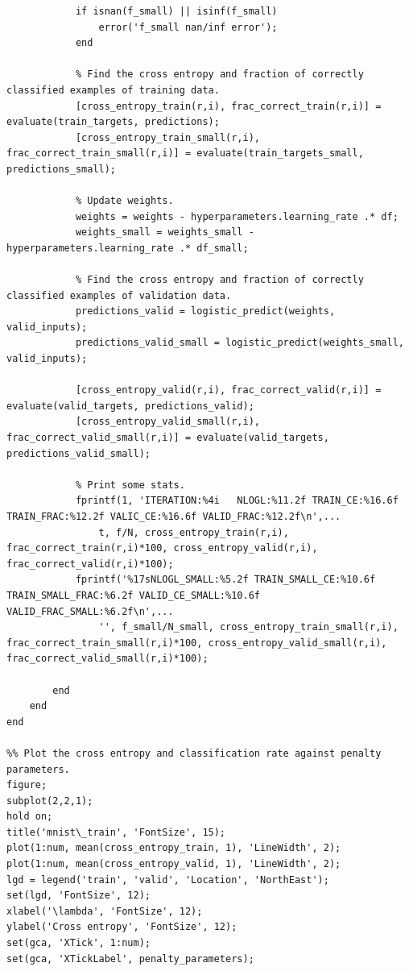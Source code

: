 \documentclass{article}
\begin{document}
\begin{lstlisting}
            if isnan(f_small) || isinf(f_small)
                error('f_small nan/inf error');
            end
            
            % Find the cross entropy and fraction of correctly classified examples of training data.
            [cross_entropy_train(r,i), frac_correct_train(r,i)] = evaluate(train_targets, predictions);
            [cross_entropy_train_small(r,i), frac_correct_train_small(r,i)] = evaluate(train_targets_small, predictions_small);
            
            % Update weights.
            weights = weights - hyperparameters.learning_rate .* df;
            weights_small = weights_small - hyperparameters.learning_rate .* df_small;
            
            % Find the cross entropy and fraction of correctly classified examples of validation data.
            predictions_valid = logistic_predict(weights, valid_inputs);
            predictions_valid_small = logistic_predict(weights_small, valid_inputs);
            
            [cross_entropy_valid(r,i), frac_correct_valid(r,i)] = evaluate(valid_targets, predictions_valid);
            [cross_entropy_valid_small(r,i), frac_correct_valid_small(r,i)] = evaluate(valid_targets, predictions_valid_small);
            
            % Print some stats.
            fprintf(1, 'ITERATION:%4i   NLOGL:%11.2f TRAIN_CE:%16.6f TRAIN_FRAC:%12.2f VALIC_CE:%16.6f VALID_FRAC:%12.2f\n',...
                t, f/N, cross_entropy_train(r,i), frac_correct_train(r,i)*100, cross_entropy_valid(r,i), frac_correct_valid(r,i)*100);
            fprintf('%17sNLOGL_SMALL:%5.2f TRAIN_SMALL_CE:%10.6f TRAIN_SMALL_FRAC:%6.2f VALID_CE_SMALL:%10.6f VALID_FRAC_SMALL:%6.2f\n',...
                '', f_small/N_small, cross_entropy_train_small(r,i), frac_correct_train_small(r,i)*100, cross_entropy_valid_small(r,i), frac_correct_valid_small(r,i)*100);
            
        end
    end
end

%% Plot the cross entropy and classification rate against penalty parameters.
figure;
subplot(2,2,1);
hold on;
title('mnist\_train', 'FontSize', 15);
plot(1:num, mean(cross_entropy_train, 1), 'LineWidth', 2);
plot(1:num, mean(cross_entropy_valid, 1), 'LineWidth', 2);
lgd = legend('train', 'valid', 'Location', 'NorthEast');
set(lgd, 'FontSize', 12);
xlabel('\lambda', 'FontSize', 12);
ylabel('Cross entropy', 'FontSize', 12);
set(gca, 'XTick', 1:num);
set(gca, 'XTickLabel', penalty_parameters);


\end{lstlisting}
\end{document}
